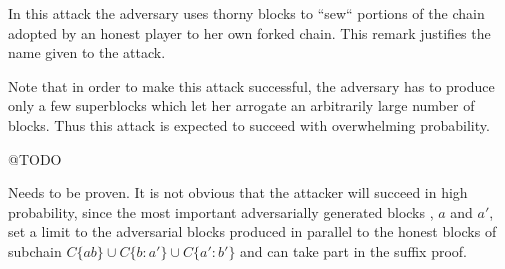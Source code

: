 In this attack the adversary uses thorny blocks to ``sew`` portions of
the chain adopted by an honest player to her own forked chain. This remark 
justifies the name given to the attack.

Note that in order to make this attack successful, the adversary has to produce
only a few superblocks which let her arrogate an arbitrarily large number of blocks. 
Thus this attack is expected to succeed with overwhelming probability.

@TODO

Needs to be proven. It is not obvious that the attacker will succeed in high
probability, since the most important adversarially generated blocks , $a$
and $a'$, set a limit to the adversarial blocks produced in parallel to the
honest blocks of subchain $C\{ab\} \cup C\{b:a'\} \cup C\{a':b'\}$ and can
take part in the suffix proof.
